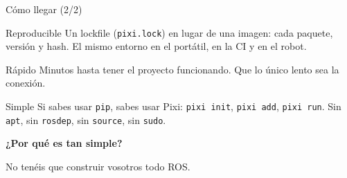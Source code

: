 \documentclass[aspectratio=169]{beamer}
\newcommand{\separador}[2]{%
\begin{frame}
  \centering
  \vfill
  {\usebeamercolor[fg]{structure}\fontsize{34}{40}\selectfont\bfseries #1\par}
  \vspace{1.2em}
  {\Large\color{halfgray} #2\par}
  \vfill
\end{frame}%
}
\begin{document}
\begin{frame}{Cómo llegar (2/2)}
\begin{block}{Reproducible}
Un lockfile (\lstinline|pixi.lock|) en lugar de una imagen: cada paquete, versión y hash. El mismo entorno en el portátil, en la CI y en el robot.
\end{block}
\begin{block}{Rápido}
Minutos hasta tener el proyecto funcionando. Que lo único lento sea la conexión.
\end{block}
\begin{block}{Simple}
Si sabes usar \texttt{pip}, sabes usar Pixi: \lstinline|pixi init|, \lstinline|pixi add|, \lstinline|pixi run|. Sin \texttt{apt}, sin \texttt{rosdep}, sin \texttt{source}, sin \texttt{sudo}.
\end{block}
\end{frame}

\separador{¿Por qué es tan simple?}{No tenéis que construir vosotros todo ROS.}
\end{document}
